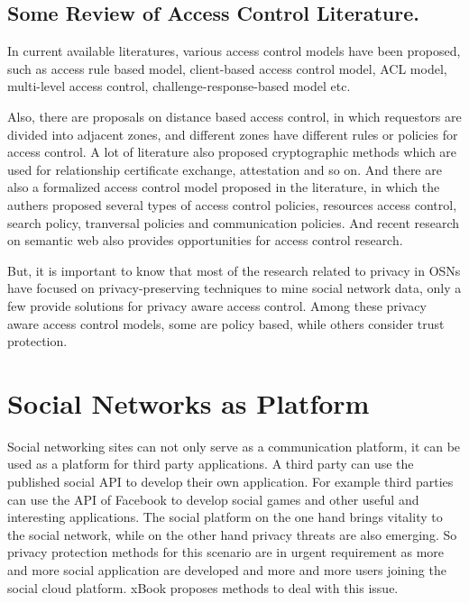 \documentclass[12pt]{article}
\begin{document}
\subsection{Some Review of Access Control Literature.}
In current available literatures, various access control models have
been proposed, such as access rule based model, client-based access
control model, ACL model, multi-level access control,
challenge-response-based model etc. 

Also, there are proposals on distance based access control, in which
requestors are divided into adjacent zones, and different zones have
different rules or policies for access control. 
A lot of literature also proposed cryptographic methods which are used
for relationship certificate exchange, attestation and so on. And there
are also a formalized access control model proposed in the literature,
in which the authers proposed several types of access control
policies, resources access control, search policy, tranversal policies
and communication policies. And recent research on semantic web also
provides opportunities for access control research.

But, it is important to know that most of the research related to
privacy in OSNs have focused on privacy-preserving techniques to mine
social network data, only a few provide solutions for privacy aware
access control. Among these privacy aware access control models, some
are policy based, while others consider trust protection. 

\section{Social Networks as Platform \label{sec:platform}}
Social networking sites can not only serve as a communication
platform, it can be used as a platform for third party applications. A
third party can use the published social API to develop their own
application. For example third parties can use the API of Facebook to
develop social games and other useful and interesting
applications. The social platform on the one hand brings vitality to
the social network, while on the other hand privacy threats are also
emerging. So privacy protection methods for this scenario are in
urgent requirement as more and more social application are developed
and more and more users joining the social cloud
platform. xBook\cite{xbook-social-platform} proposes methods to deal
with this issue. 
\end{document}
